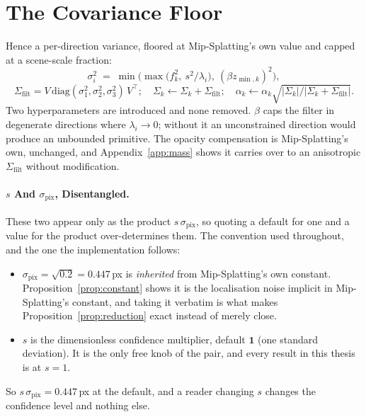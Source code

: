 
\section{The Covariance Floor}
Hence a per-direction variance, floored at Mip-Splatting's own value and capped
at a scene-scale fraction:
\begin{equation}
  \sigma_i^2 \;=\; \min\!\Big(\max\big(f_k^2,\ s^2/\lambda_i\big),\ (\beta z_{\min,k})^2\Big),
  \label{eq:filtervar}
\end{equation}
\begin{equation}
  \Sigma_{\mathrm{filt}} = V\,\mathrm{diag}(\sigma_1^2,\sigma_2^2,\sigma_3^2)\,V^{\!\top};
  \quad \Sigma_k \leftarrow \Sigma_k + \Sigma_{\mathrm{filt}};
  \quad \alpha_k \leftarrow \alpha_k\sqrt{|\Sigma_k|/|\Sigma_k+\Sigma_{\mathrm{filt}}|}.
  \label{eq:filter}
\end{equation}
Two hyperparameters are introduced and none removed. $\beta$ caps the filter in
degenerate directions where $\lambda_i \to 0$; without it an unconstrained
direction would produce an unbounded primitive. The opacity compensation is
Mip-Splatting's own, unchanged, and Appendix~\ref{app:mass} shows it carries over
to an anisotropic $\Sigma_{\mathrm{filt}}$ without modification.

\paragraph{$s$ And $\sigma_{\mathrm{pix}}$, Disentangled.} These two appear only
as the product $s\,\sigma_{\mathrm{pix}}$, so quoting a default for one and a
value for the product over-determines them. The convention used throughout, and
the one the implementation follows:
\begin{itemize}[leftmargin=1.4em,itemsep=2pt]
  \item $\sigma_{\mathrm{pix}} = \sqrt{0.2} = 0.447$\,px is \emph{inherited} from Mip-Splatting's own constant. Proposition~\ref{prop:constant} shows it is the localisation
        noise implicit in Mip-Splatting's constant, and taking it verbatim is
        what makes Proposition~\ref{prop:reduction} exact instead of merely close.
  \item $s$ is the dimensionless confidence multiplier, default $\mathbf{1}$
        (one standard deviation). It is the only free knob of the pair, and
        every result in this thesis is at $s=1$.
\end{itemize}
So $s\,\sigma_{\mathrm{pix}} = 0.447$\,px at the default, and a reader changing
$s$ changes the confidence level and nothing else.

